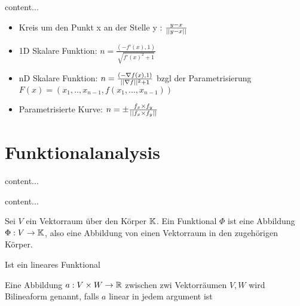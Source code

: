 \begin{definition}[Normalenvektor]
	content...
\end{definition}


\begin{satz}
	\begin{itemize}[noitemsep]
		\item Kreis um den Punkt x an der Stelle y : $\frac{y - x}{||y - x||}$
		\item 1D Skalare Funktion: $n = \frac{(-f'(x), 1)}{\sqrt{f'(x)^2 + 1}}$
		\item nD Skalare Funktion: $n = \frac{(-\nabla f(x), 1)}{ ||\nabla f||^2 + 1}$ bzgl der Parametrisierung 
		 $F(x) = (x_1, .., x_{n-1}, f(x_1, ..., x_{n-1}))$	
		\item Parametrisierte Kurve: $n = \pm \frac{f_x \times f_y}{||f_x \times f_y||}$
	\end{itemize}
\end{satz}

\pagebreak

\section{Funktionalanalysis}

\begin{definition}
	content...
\end{definition}

\begin{definition}[Funktionsräume]
	content...
\end{definition}

\begin{definition}[Funktional]
	Sei $V$ ein Vektorraum über den Körper $\mathbb{K}$. Ein Funktional $\Phi$ ist eine Abbildung $\Phi : V \rightarrow \mathbb{K}$, also eine Abbildung von einen Vektorraum in den zugehörigen Körper.
\end{definition}

\begin{definition}
	Ist ein lineares Funktional
\end{definition}

\begin{definition}
	Eine Abbildung $a : V \times W \rightarrow \mathbb{R}$ zwischen zwi Vektorräumen $V,W$ wird Bilineaform genannt, falls $a$ linear in jedem argument ist
\end{definition}

